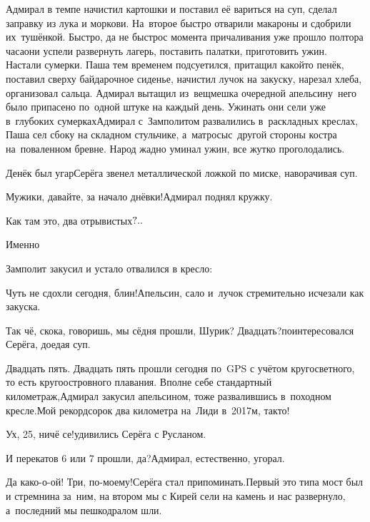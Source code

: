 Адмирал в темпе начистил картошки и поставил её вариться на суп, сделал заправку из лука и моркови. На~второе быстро отварили макароны и сдобрили их~тушёнкой. Быстро, да не быстро\mdash с момента причаливания уже прошло полтора часа\mdash они успели развернуть лагерь, поставить палатки, приготовить ужин. Настали сумерки. Паша тем временем подсуетился, притащил какой\sdash то пенёк, поставил сверху байдарочное сиденье, начистил лучок на закуску, нарезал хлеба, организовал сальца. Адмирал вытащил из~вещмешка очередной апельсин\mdash у~него было припасено по~одной штуке на каждый день. Ужинать они сели уже в~глубоких сумерках\mdash Адмирал с~Замполитом развалились в~раскладных креслах, Паша сел сбоку на складном стульчике, а~матросы\mdash с~другой стороны костра на~поваленном бревне. Народ жадно уминал ужин, все жутко проголодались.

\diagdash Денёк был угар\myldots{}\mdash Серёга звенел металлической ложкой по миске, наворачивая суп.%

\diagdash Мужики, давайте, за начало днёвки!\mdash Адмирал поднял кружку.

\diagdash Как там это, два отрывистых$\quldots$

\diagdash Именно\myldots{}


Замполит закусил и устало отвалился в кресло:

\diagdash Чуть не сдохли сегодня, блин!\mdash Апельсин, сало и~лучок стремительно исчезали как закуска.

\diagdash Так чё, скока, говоришь, мы сёдня прошли, Шурик? Двадцать?\mdash поинтересовался Серёга, доедая суп.

\diagdash Двадцать пять. Двадцать пять прошли сегодня по~GPS с учётом кругосветного, то есть кругоостровного плавания. Вполне себе стандартный километраж,\mdash Адмирал закусил апельсином, тоже развалившись в~походном кресле.\mdash Мой рекорд\mdash сорок два километра на~Лиди в~2017\sdash м, так\sdash то!

\diagdash Ух, 25, ничё се!\mdash удивились Серёга с Русланом.

\diagdash И перекатов 6 или 7 прошли, да?\mdash Адмирал, естественно, угорал.

\diagdash Да како-о-ой! Три, по-моему!\mdash Серёга стал припоминать.\mdash Первый это типа мост был и стремнина за~ним, на втором мы с Кирей сели на камень и нас развернуло, а~последний мы пешкодралом шли.

